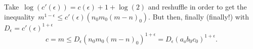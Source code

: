 Take~$\log(c'(\epsilon))=c(\epsilon)+1+\log(2)$ and reshuffle in order to get the inequality~$m^{1-\epsilon} \leq c'(\epsilon)(n_0m_0(m-n)_0)$. But then, finally (finally!) with~$D_\epsilon=c'(\epsilon)^{1+\epsilon}$
\begin{equation}
  c=m \leq D_\epsilon(n_0m_0(m-n)_0)^{1+\epsilon} = D_\epsilon(a_ob_0c_0)^{1+\epsilon}.
\end{equation}

